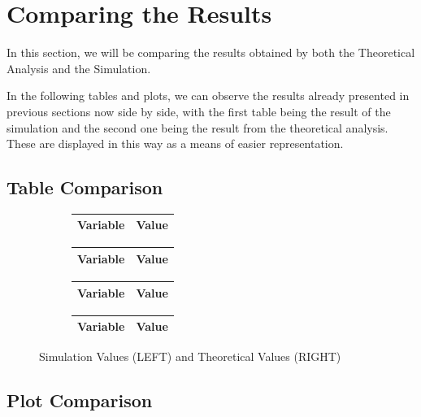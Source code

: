 \clearpage

\section{Comparing the Results}
\label{sec:comparing}

In this section, we will be comparing the results obtained by both the Theoretical Analysis and the Simulation.

In the following tables and plots, we can observe the results already presented in previous sections now side by side, with the first table being the result of the simulation and the second one being the result from the theoretical analysis. These are displayed in this
way as a means of easier representation.

\subsection{Table Comparison}


\begin{figure}[ht]
\centering
\begin{subfigure}{.5\textwidth}
  \centering
  \begin{tabular}{|l|r|}
  \hline    
  {\bf Variable} & {\bf Value} \\ \hline
  
  \end{tabular}
  \begin{tabular}{|l|r|}
  \hline    
  {\bf Variable} & {\bf Value} \\ \hline
  
 \end{tabular}
 \begin{tabular}{|l|r|}
  \hline    
  {\bf Variable} & {\bf Value} \\ \hline
  
  \hline
  \end{tabular}
\end{subfigure}%
\begin{subfigure}{.4\textwidth}
  \centering
  \begin{tabular}{|l|r|}
  \hline    
  {\bf Variable} & {\bf Value} \\ \hline
  
  \end{tabular}
\end{subfigure}
\caption{Simulation Values (LEFT) and Theoretical Values (RIGHT)}
\label{fig:sbs1}
\end{figure}


\subsection{Plot Comparison}

